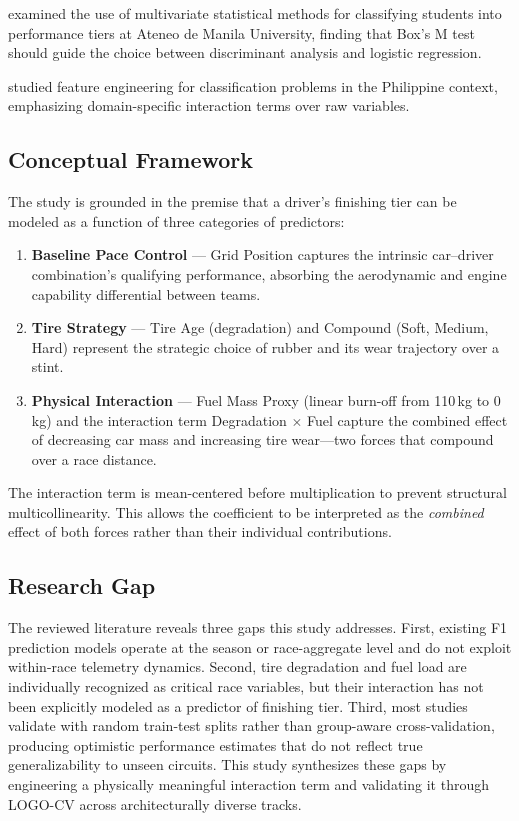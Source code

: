 \textcite{mendoza2023} examined the use of multivariate statistical methods
for classifying students into performance tiers at Ateneo de Manila
University, finding that Box's M test should guide the choice between
discriminant analysis and logistic regression.

\textcite{santos2020} studied feature engineering for classification problems
in the Philippine context, emphasizing domain-specific interaction terms over
raw variables.

\subsection{Conceptual Framework}

The study is grounded in the premise that a driver's finishing tier can be
modeled as a function of three categories of predictors:

\begin{enumerate}[label=(\arabic*)]
  \item \textbf{Baseline Pace Control} --- Grid Position captures the
    intrinsic car--driver combination's qualifying performance, absorbing
    the aerodynamic and engine capability differential between teams.
  \item \textbf{Tire Strategy} --- Tire Age (degradation) and Compound
    (Soft, Medium, Hard) represent the strategic choice of rubber and its
    wear trajectory over a stint.
  \item \textbf{Physical Interaction} --- Fuel Mass Proxy (linear burn-off
    from 110\,kg to 0\,kg) and the interaction term Degradation $\times$
    Fuel capture the combined effect of decreasing car mass and increasing
    tire wear---two forces that compound over a race distance.
\end{enumerate}

\noindent
The interaction term is mean-centered before multiplication to prevent
structural multicollinearity. This allows the coefficient to be interpreted
as the \textit{combined} effect of both forces rather than their individual
contributions.

\subsection{Research Gap}

The reviewed literature reveals three gaps this study addresses. First,
existing F1 prediction models operate at the season or race-aggregate level
and do not exploit within-race telemetry dynamics. Second, tire degradation
and fuel load are individually recognized as critical race variables, but
their interaction has not been explicitly modeled as a predictor of finishing
tier. Third, most studies validate with random train-test splits rather than
group-aware cross-validation, producing optimistic performance estimates that
do not reflect true generalizability to unseen circuits. This study
synthesizes these gaps by engineering a physically meaningful interaction
term and validating it through LOGO-CV across architecturally diverse tracks.


